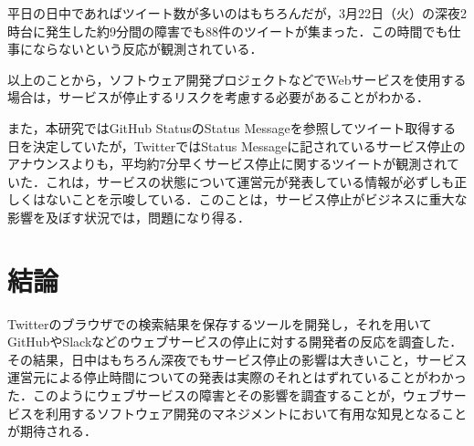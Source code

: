 \documentclass[uplatex,twocolumn]{jsarticle}
\begin{document}
平日の日中であればツイート数が多いのはもちろんだが，3月22日（火）の深夜2時台に発生した約9分間の障害でも88件のツイートが集まった．この時間でも仕事にならないという反応が観測されている．

以上のことから，ソフトウェア開発プロジェクトなどでWebサービスを使用する場合は，サービスが停止するリスクを考慮する必要があることがわかる．

また，本研究ではGitHub StatusのStatus Messageを参照してツイート取得する日を決定していたが，TwitterではStatus Messageに記されているサービス停止のアナウンスよりも，平均約7分早くサービス停止に関するツイートが観測されていた．これは，サービスの状態について運営元が発表している情報が必ずしも正しくはないことを示唆している．このことは，サービス停止がビジネスに重大な影響を及ぼす状況では，問題になり得る．

\section{結論}
Twitterのブラウザでの検索結果を保存するツールを開発し，それを用いてGitHubやSlackなどのウェブサービスの停止に対する開発者の反応を調査した．その結果，日中はもちろん深夜でもサービス停止の影響は大きいこと，サービス運営元による停止時間についての発表は実際のそれとはずれていることがわかった．このようにウェブサービスの障害とその影響を調査することが，ウェブサービスを利用するソフトウェア開発のマネジメントにおいて有用な知見となることが期待される．

\end{document}
